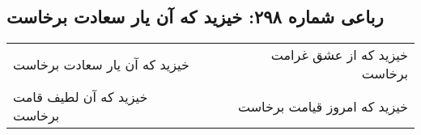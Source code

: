 \begin{center}
\section*{رباعی شماره ۲۹۸: خیزید که آن یار سعادت برخاست}
\label{sec:0298}
\begin{longtable}{l p{0.5cm} r}
خیزید که آن یار سعادت برخاست
&&
خیزید که از عشق غرامت برخاست
\\
خیزید که آن لطیف قامت برخاست
&&
خیزید که امروز قیامت برخاست
\\
\end{longtable}
\end{center}
